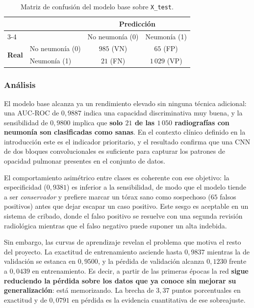 \documentclass[11pt, a4paper]{article}
\numberwithin{equation}{section}
\begin{document}
\begin{table}[H]
\centering
\caption{Matriz de confusión del modelo base sobre \texttt{X\_test}.}
\label{tab:cm_base}
\begin{tabular}{llcc}
\toprule
& & \multicolumn{2}{c}{\textbf{Predicción}} \\
\cmidrule(l){3-4}
& & No neumonía (0) & Neumonía (1) \\
\midrule
\multirow{2}{*}{\textbf{Real}}
& No neumonía (0) & $985$ (VN) & $65$ (FP) \\
& Neumonía (1)    & $21$ (FN)  & $1\,029$ (VP) \\
\bottomrule
\end{tabular}
\end{table}


\subsubsection{Análisis}

El modelo base alcanza ya un rendimiento elevado sin ninguna técnica adicional: una
AUC-ROC de $0{,}9887$ indica una capacidad discriminativa muy buena, y la sensibilidad
de $0{,}9800$ implica que \textbf{solo $21$ de las $1\,050$ radiografías con neumonía
son clasificadas como sanas}. En el contexto clínico definido en la introducción este
es el indicador prioritario, y el resultado confirma que una CNN de dos bloques
convolucionales es suficiente para capturar los patrones de opacidad pulmonar presentes
en el conjunto de datos.

El comportamiento asimétrico entre clases es coherente con ese objetivo: la
especificidad ($0{,}9381$) es inferior a la sensibilidad, de modo que el modelo tiende
a ser \textit{conservador} y prefiere marcar un tórax sano como sospechoso ($65$ falsos
positivos) antes que dejar escapar un caso positivo. Este sesgo es aceptable en un
sistema de cribado, donde el falso positivo se resuelve con una segunda revisión
radiológica mientras que el falso negativo puede suponer un alta indebida.

Sin embargo, las curvas de aprendizaje revelan el problema que motiva el resto del
proyecto. La exactitud de entrenamiento asciende hasta $0{,}9837$ mientras la de
validación se estanca en $0{,}9500$, y la pérdida de validación alcanza $0{,}1230$
frente a $0{,}0439$ en entrenamiento. Es decir, a partir de las primeras épocas la red
\textbf{sigue reduciendo la pérdida sobre los datos que ya conoce sin mejorar su
generalización}: está memorizando. La brecha de $3{,}37$ puntos porcentuales en
exactitud y de $0{,}0791$ en pérdida es la evidencia cuantitativa de ese sobreajuste.
\end{document}

